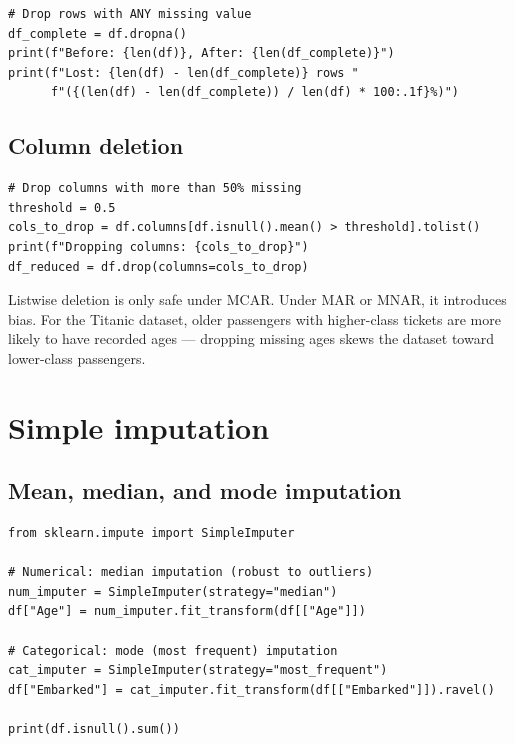 \begin{verbatim}
# Drop rows with ANY missing value
df_complete = df.dropna()
print(f"Before: {len(df)}, After: {len(df_complete)}")
print(f"Lost: {len(df) - len(df_complete)} rows "
      f"({(len(df) - len(df_complete)) / len(df) * 100:.1f}%)")
\end{verbatim}

\subsection{Column deletion}

\begin{verbatim}
# Drop columns with more than 50% missing
threshold = 0.5
cols_to_drop = df.columns[df.isnull().mean() > threshold].tolist()
print(f"Dropping columns: {cols_to_drop}")
df_reduced = df.drop(columns=cols_to_drop)
\end{verbatim}

\begin{warningbox}
Listwise deletion is only safe under MCAR. Under MAR or MNAR, it introduces bias. For the Titanic dataset, older passengers with higher-class tickets are more likely to have recorded ages --- dropping missing ages skews the dataset toward lower-class passengers.
\end{warningbox}

\section{Simple imputation}

\subsection{Mean, median, and mode imputation}

\begin{verbatim}
from sklearn.impute import SimpleImputer

# Numerical: median imputation (robust to outliers)
num_imputer = SimpleImputer(strategy="median")
df["Age"] = num_imputer.fit_transform(df[["Age"]])

# Categorical: mode (most frequent) imputation
cat_imputer = SimpleImputer(strategy="most_frequent")
df["Embarked"] = cat_imputer.fit_transform(df[["Embarked"]]).ravel()

print(df.isnull().sum())
\end{verbatim}

